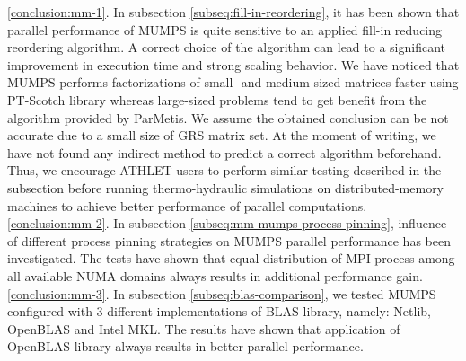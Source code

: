 \ref{conclusion:mm-1}. In subsection \ref{subseq:fill-in-reordering}, it has been shown that parallel performance of MUMPS is quite sensitive to an applied fill-in reducing reordering algorithm. A correct choice of the algorithm can lead to a significant improvement in execution time and strong scaling behavior. We have noticed that MUMPS performs factorizations of small- and medium-sized matrices faster using PT-Scotch library whereas large-sized problems tend to get benefit from the algorithm provided by ParMetis. We assume the obtained conclusion can be not accurate due to a small size of GRS matrix set. At the moment of writing, we have not found any indirect method to predict a correct algorithm beforehand. Thus, we encourage ATHLET users to perform similar testing described in the subsection before running thermo-hydraulic simulations on distributed-memory machines to achieve better performance of parallel computations.\\




\ref{conclusion:mm-2}. In subsection \ref{subseq:mm-mumps-process-pinning}, influence of different process pinning strategies on MUMPS parallel performance has been investigated. The tests have shown that equal distribution of MPI process among all available NUMA domains always results in additional performance gain.\\ %


\ref{conclusion:mm-3}. 
In subsection \ref{subseq:blas-comparison},
we tested MUMPS configured with 3 different implementations of BLAS library, namely: Netlib, OpenBLAS and Intel MKL. The results have shown that application of OpenBLAS library always results in better parallel performance.\\




